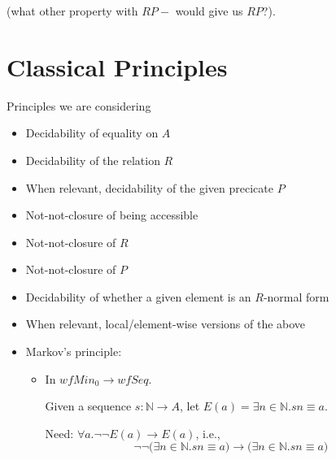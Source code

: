 \documentclass{scrartcl}
\newcommand{\nat}{\mathbb{N}}
\begin{document}
(what other property with $RP-$ would give us $RP$?).

\section{Classical Principles}
Principles we are considering
\begin{itemize}
  \item Decidability of equality on $A$
  \item Decidability of the relation $R$
  \item When relevant, decidability of the given precicate $P$
  \item Not-not-closure of being accessible
  \item Not-not-closure of $R$
  \item Not-not-closure of $P$
  \item Decidability of whether a given element is an $R$-normal form
  \item When relevant, local/element-wise versions of the above
  \item Markov's principle:
  \begin{itemize}
    \item In $wfMin_0 \to wfSeq$.

    Given a sequence $s : \nat \to A$, let $E(a) = \exists n \in \nat. s n \equiv a$.

    Need: $\forall a. \lnot\lnot E(a) \to E(a)$, i.e.,
    \[\lnot\lnot \big(\exists n \in \nat. s n \equiv a\big)
          \to \big(\exists n \in \nat. s n \equiv a\big)\]

  \end{itemize}
\end{itemize}
\end{document}
